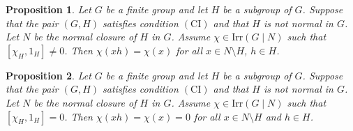 \documentclass[10pt,a4paper]{amsart}
\newtheorem{prop}{Proposition}
\newcommand{\CI}{\mathrm{(CI)}}
\newcommand{\Irr}{\mathrm {Irr}}
\begin{document}
\begin{prop}\label{prop6}
Let $G$ be a finite group and let $H$ be a subgroup of $G$.	Suppose that the pair $(G,H)$ satisfies condition $\CI$ and that $H$ is not normal in $G$. Let $N$ be the normal closure of $H$ in $G$. Assume $\chi\in \Irr(G\mid N)$ such that $[\chi_H,1_H] \neq 0$. Then $\chi(xh) = \chi(x)$ for all $x\in N\setminus H$, $h\in H$.
\end{prop}

\begin{prop}\label{prop7}
Let $G$ be a finite group and let $H$ be a subgroup of $G$.	Suppose that the pair $(G,H)$ satisfies condition $\CI$ and that $H$ is not normal in $G$. Let $N$ be the normal closure of $H$ in $G$. Assume $\chi \in \Irr(G\mid N)$ such that $[\chi_H,1_H]=0$. Then $\chi(xh) = \chi(x)=0$ for all $x\in N\setminus H$ and $h\in H$.
\end{prop}
\end{document}
